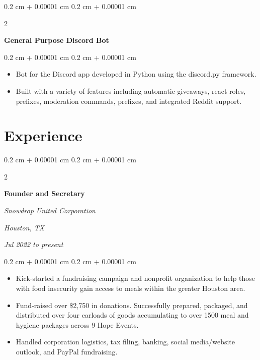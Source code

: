 \documentclass[10pt, letterpaper]{article}
\newenvironment{highlights}{
    \begin{itemize}[
        topsep=0.10 cm,
        parsep=0.10 cm,
        partopsep=0pt,
        itemsep=0pt,
        leftmargin=0.4 cm + 10pt
    ]
}{
    \end{itemize}
} %
\newenvironment{onecolentry}{
    \begin{adjustwidth}{
        0.2 cm + 0.00001 cm
    }{
        0.2 cm + 0.00001 cm
    }
}{
    \end{adjustwidth}
} %
\newenvironment{twocolentry}[2][]{
    \onecolentry
    \def\secondColumn{#2}
    \setcolumnwidth{\fill, 4.5 cm}
    \begin{paracol}{2}
}{
    \switchcolumn \raggedleft \secondColumn
    \end{paracol}
    \endonecolentry
} %
\let\hrefWithoutArrow\href
\renewcommand{\href}[2]{\hrefWithoutArrow{#1}{\ifthenelse{\equal{#2}{}}{ }{#2 }\raisebox{.15ex}{\footnotesize \faExternalLink*}}}
\begin{document}
        \vspace{0.2 cm}

        \begin{twocolentry}{
            
            
        \textit{\href{https://github.com/afshaalzubair/s-discord-bot}{Github Repo}}}
            \textbf{General Purpose Discord Bot}
        \end{twocolentry}

        \vspace{0.10 cm}
        \begin{onecolentry}
            \begin{highlights}
                \item Bot for the Discord app developed in Python using the discord.py framework.
                \item Built with a variety of features including automatic giveaways, react roles, prefixes, moderation commands, prefixes, and integrated Reddit support.
            \end{highlights}
        \end{onecolentry}



    
    \section{Experience}



        
        \begin{twocolentry}{
        \textit{Houston, TX}    
            
        \textit{Jul 2022 to present}}
            \textbf{Founder and Secretary}
            
            \textit{Snowdrop United Corporation}
        \end{twocolentry}

        \vspace{0.10 cm}
        \begin{onecolentry}
            \begin{highlights}
                \item Kick-started a fundraising campaign and nonprofit organization to help those with food insecurity gain access to meals within the greater Houston area.
                \item Fund-raised over \$2,750 in donations. Successfully prepared, packaged, and distributed over four carloads of goods accumulating to over 1500 meal and hygiene packages across 9 Hope Events.
                \item Handled corporation logistics, tax filing, banking, social media/website outlook, and PayPal fundraising.
            \end{highlights}
        \end{onecolentry}
\end{document}
